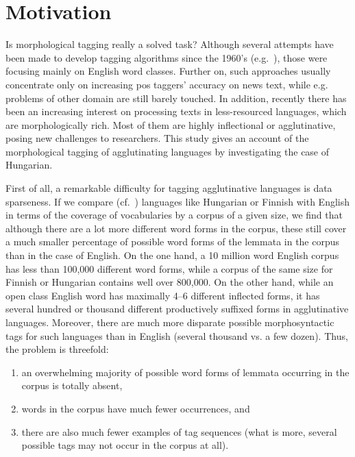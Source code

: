 \section{Motivation}

Is morphological tagging really a solved task? 
Although several attempts have been made to develop tagging algorithms since the 1960’s (e.g.~\cite{Stolz1965,Klein1963}), those were focusing mainly on English word classes. 
Further on, such approaches usually concentrate only on increasing \gls{pos} taggers’ accuracy on news text, while e.g. problems of other domain are still barely touched. 
In addition, recently there has been an increasing interest on processing texts in less-resourced languages, which are morphologically rich. 
Most of them are highly inflectional or agglutinative, posing new challenges to researchers. This study gives an account of the morphological tagging of agglutinating languages by investigating the case of Hungarian. 

First of all, a remarkable difficulty for tagging agglutinative languages is data sparseness. If we compare (cf.~\cite{Oravecz2002a}) languages like Hungarian or Finnish with English in terms of the coverage of vocabularies by a corpus of a given size, we find that although there are a lot more different word forms in the corpus, these still cover a much smaller percentage of possible word forms of the lemmata in the corpus than in the case of English. 
On the one hand, a 10 million word English corpus has less than 100,000 different word forms, while a corpus of the same size for Finnish or Hungarian contains well over 800,000. On the other hand, while an open class English word has maximally 4--6 different inflected forms, it has several hundred or thousand different productively suffixed forms in agglutinative languages. Moreover, there are much more disparate possible morphosyntactic tags for such languages than in English (several thousand vs. a few dozen). 
Thus, the problem is threefold:
\begin{enumerate}
  \item an overwhelming majority of possible word forms of lemmata occurring in the corpus is totally absent,
  \item words in the corpus have much fewer occurrences, and
  \item there are also much fewer examples of tag sequences (what is more, several possible tags may not occur in the corpus at all).
\end{enumerate}

